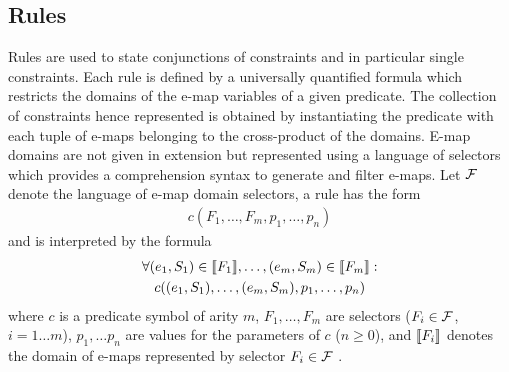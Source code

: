 \subsection{Rules}
\label{sec:rules}
Rules are used to state conjunctions of constraints and in particular single constraints. %
Each rule is defined by a universally quantified formula which restricts the domains of the e-map variables of a given predicate.
The collection of constraints hence represented is obtained by instantiating the predicate with each tuple of e-maps belonging to the cross-product of the domains.
E-map domains are not given in extension
but represented using a language of selectors
which provides a comprehension syntax to generate and filter e-maps.
Let 
${\mathcal{F}}$
denote the language of e-map domain selectors,
a {\UTP} rule has the form %
\begin{align}
c(F_1,\ldots,F_m,p_1,\ldots,p_n)
\end{align}
and is interpreted by %
the %
formula
\begin{multline}
\forall (e_1,S_1)\in\llbracket F_1\rrbracket,\ldots,(e_m,S_m)\in\llbracket F_{m}\rrbracket:\\
c((e_1,S_1),\ldots,(e_m,S_m),p_1,\ldots,p_n)
\label{rule:rule}
\end{multline}
where 
$c$ is a predicate symbol of arity $m$,
$F_1,\ldots,F_m$ are selectors ($F_i\in{\mathcal{F}}$, $i=1\ldots m$),
$p_1,\ldots p_n$ are values for the parameters of $c$ ($n\geq0$),
and
$\llbracket F_i\rrbracket$
denotes the domain of e-maps represented by
selector 
$
F_i\in{\mathcal{F}}
$
.

